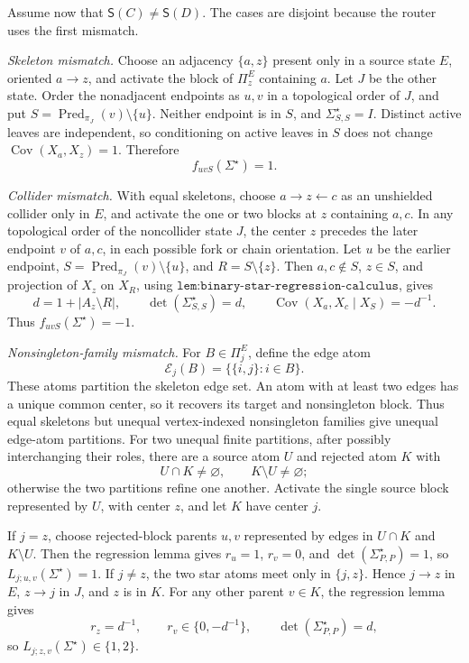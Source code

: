 Assume now that \(\mathsf S(C)\ne\mathsf S(D)\).  The cases are disjoint because the router uses the first mismatch.

\emph{Skeleton mismatch.}
Choose an adjacency \(\{a,z\}\) present only in a source state \(E\), oriented \(a\to z\), and activate the block of \(\Pi^E_z\) containing \(a\).  Let \(J\) be the other state.  Order the nonadjacent endpoints as \(u,v\) in a topological order of \(J\), and put \(S=\operatorname{Pred}_{\pi_J}(v)\setminus\{u\}\).  Neither endpoint is in \(S\), and \(\Sigma^{\star}_{S,S}=I\).  Distinct active leaves are independent, so conditioning on active leaves in \(S\) does not change \(\operatorname{Cov}(X_a,X_z)=1\).  Therefore
\[
 f_{uvS}(\Sigma^{\star})=1.
\]

\emph{Collider mismatch.}
With equal skeletons, choose \(a\to z\leftarrow c\) as an unshielded collider only in \(E\), and activate the one or two blocks at \(z\) containing \(a,c\).  In any topological order of the noncollider state \(J\), the center \(z\) precedes the later endpoint \(v\) of \(a,c\), in each possible fork or chain orientation.  Let \(u\) be the earlier endpoint, \(S=\operatorname{Pred}_{\pi_J}(v)\setminus\{u\}\), and \(R=S\setminus\{z\}\).  Then \(a,c\notin S\), \(z\in S\), and projection of \(X_z\) on \(X_R\), using \(\texttt{lem:binary-star-regression-calculus}\), gives
\[
 d=1+|A_z\setminus R|,\qquad
 \det(\Sigma^{\star}_{S,S})=d,\qquad
 \operatorname{Cov}(X_a,X_c\mid X_S)=-d^{-1}.
\]
Thus \(f_{uvS}(\Sigma^{\star})=-1\).

\emph{Nonsingleton-family mismatch.}
For \(B\in\Pi^E_j\), define the edge atom
\[
 \mathscr E_j(B)=\{\{i,j\}:i\in B\}.
\]
These atoms partition the skeleton edge set.  An atom with at least two edges has a unique common center, so it recovers its target and nonsingleton block.  Thus equal skeletons but unequal vertex-indexed nonsingleton families give unequal edge-atom partitions.  For two unequal finite partitions, after possibly interchanging their roles, there are a source atom \(U\) and rejected atom \(K\) with
\[
 U\cap K\ne\varnothing,\qquad K\setminus U\ne\varnothing;
\]
otherwise the two partitions refine one another.  Activate the single source block represented by \(U\), with center \(z\), and let \(K\) have center \(j\).

If \(j=z\), choose rejected-block parents \(u,v\) represented by edges in \(U\cap K\) and \(K\setminus U\).  Then the regression lemma gives \(r_u=1\), \(r_v=0\), and \(\det(\Sigma^{\star}_{P,P})=1\), so \(L_{j;u,v}(\Sigma^{\star})=1\).  If \(j\ne z\), the two star atoms meet only in \(\{j,z\}\).  Hence \(j\to z\) in \(E\), \(z\to j\) in \(J\), and \(z\) is in \(K\).  For any other parent \(v\in K\), the regression lemma gives
\[
 r_z=d^{-1},\qquad r_v\in\{0,-d^{-1}\},\qquad
 \det(\Sigma^{\star}_{P,P})=d,
\]
so \(L_{j;z,v}(\Sigma^{\star})\in\{1,2\}\).

